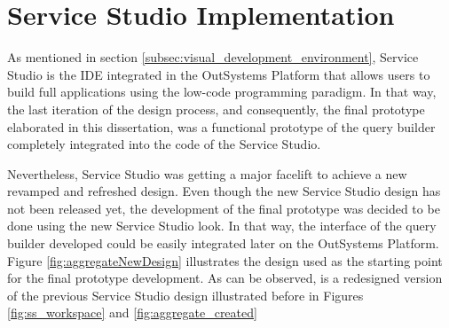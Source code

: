 










\section{Service Studio Implementation}
\label{sec:service_studio_implementation}

As mentioned in section \ref{subsec:visual_development_environment}, Service Studio is the \gls{IDE} integrated in the OutSystems Platform that allows users to build full applications using the low-code programming paradigm. In that way, the last iteration of the design process, and consequently, the final prototype elaborated in this dissertation, was a functional prototype of the query builder completely integrated into the code of the Service Studio.

Nevertheless, Service Studio was getting a major facelift to achieve a new revamped and refreshed design. Even though the new Service Studio design has not been released yet, the development of the final prototype was decided to be done using the new Service Studio look. In that way, the interface of the query builder developed could be easily integrated later on the OutSystems Platform. Figure \ref{fig:aggregateNewDesign} illustrates the design used as the starting point for the final prototype development. As can be observed, is a redesigned version of the previous Service Studio design illustrated before in Figures \ref{fig:ss_workspace} and \ref{fig:aggregate_created}

